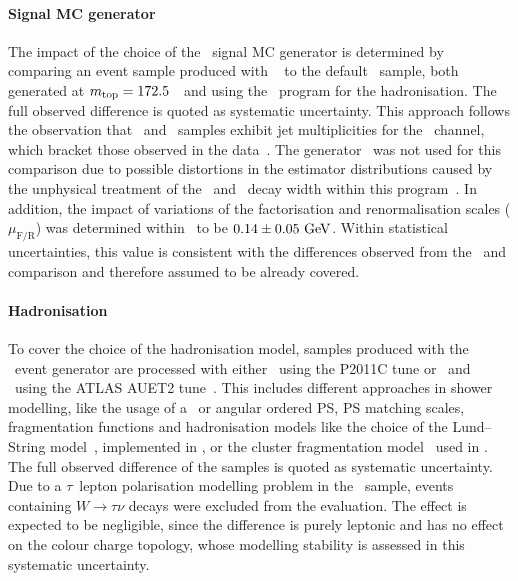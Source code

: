 \paragraph{Signal \glsdesc{MC} generator}\mbox{}
%
The impact of the choice of the \ttbar\ signal \gls{MC} generator is determined by comparing an event sample produced with \Mcatnlo~\cite{FRI-0201,FRI-0301} to the default \Powheg\ sample, both generated at $m_{\mathrm{top}}=172.5$~\GeV\ and using the \Herwig\ program for the hadronisation.
%
The full observed difference is quoted as systematic uncertainty.
%
This approach follows the observation that \Mcatnlo\ and \Powheg\ samples exhibit jet multiplicities for the \ttbarlj\ channel, which bracket those observed in the data~\cite{ATLASCollaboration2015}.
%
The generator \Alpgen\ was not used for this comparison due to possible distortions in the estimator distributions caused by the unphysical treatment of the \tquark\ and \Wboson\ decay width within this program~\cite{ATL-PHYS-INT-2014-001}. 
%
In addition, the impact of variations of the factorisation and renormalisation scales ($\mu_{\mathrm{F/R}}$) was determined within \Powheg\ to be $0.14\pm 0.05~\mathrm{GeV}$. 
%
Within statistical uncertainties, this value is consistent with the differences observed from the \Mcatnlo\ and \Powheg comparison and therefore assumed to be already covered.
%  
%  
\paragraph{Hadronisation}\mbox{}
%
To cover the choice of the hadronisation model, samples produced with the \Powheg\ event generator are processed with either \Pythia\ using the P2011C tune or \Herwig\ and \Jimmy\ using the ATLAS AUET2 tune~\cite{ATL-PHYS-PUB-2011-008}.
%
This includes different approaches in shower modelling, like the usage of a \pt\ or angular ordered \gls{PS}, \gls{PS} matching scales, fragmentation functions and hadronisation models like the choice of the Lund--String model~\cite{Andersson198331,Andersson:1998tv}, implemented in \Pythia, or the cluster fragmentation model~\cite{Webber:1983if} used in \Herwig. 
%
The full observed difference of the samples is quoted as systematic uncertainty. 
%
Due to a $\tau$~lepton polarisation modelling problem in the \PowhegHerwig\ sample, events containing $W\to \tau\nu$ decays were excluded from the evaluation. The effect is expected to be negligible, since the difference is purely leptonic and has no effect on the colour charge topology, whose modelling stability is assessed in this systematic uncertainty. 




